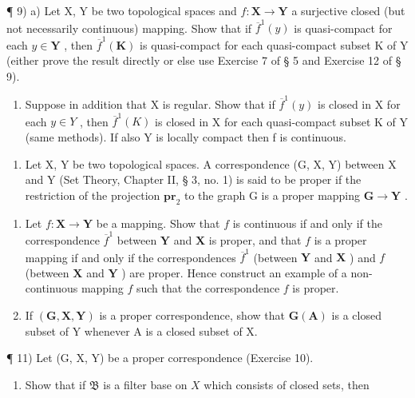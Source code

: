 ¶ 9) a) Let X, Y be two topological spaces and \(f: \mathbf{X} \to \mathbf{Y}\) a surjective closed (but not necessarily continuous) mapping. Show that if \(\overline{f}^{1}(y)\) is quasi-compact for each \(y \in \mathbf{Y}\) , then \(\overline{f}^{1}(\mathbf{K})\) is quasi-compact for each quasi-compact subset K of Y (either prove the result directly or else use Exercise 7 of § 5 and Exercise 12 of § 9).

\begin{enumerate}
\def\labelenumi{\alph{enumi})}
\setcounter{enumi}{1}
\tightlist
\item
  Suppose in addition that X is regular. Show that if \(\overline{f}^{1}(y)\) is closed in X for each \(y \in Y\) , then \(\overline{f}^{1}(K)\) is closed in X for each quasi-compact subset K of Y (same methods). If also Y is locally compact then f is continuous.
\end{enumerate}

\begin{enumerate}
\def\labelenumi{\arabic{enumi})}
\setcounter{enumi}{9}
\tightlist
\item
  Let X, Y be two topological spaces. A correspondence (G, X, Y) between X and Y (Set Theory, Chapter II, § 3, no. 1) is said to be proper if the restriction of the projection \(\mathbf{pr}_2\) to the graph G is a proper mapping \(\mathbf{G} \to \mathbf{Y}\) .
\end{enumerate}

\begin{enumerate}
\def\labelenumi{\alph{enumi})}
\item
  Let \(f: \mathbf{X} \to \mathbf{Y}\) be a mapping. Show that \(f\) is continuous if and only if the correspondence \(\overline{f}^1\) between \(\mathbf{Y}\) and \(\mathbf{X}\) is proper, and that \(f\) is a proper mapping if and only if the correspondences \(\overline{f}^1\) (between \(\mathbf{Y}\) and \(\mathbf{X}\) ) and \(f\) (between \(\mathbf{X}\) and \(\mathbf{Y}\) ) are proper. Hence construct an example of a non-continuous mapping \(f\) such that the correspondence \(f\) is proper.
\item
  If \((\mathbf{G}, \mathbf{X}, \mathbf{Y})\) is a proper correspondence, show that \(\mathbf{G}(\mathbf{A})\) is a closed subset of Y whenever A is a closed subset of X.
\end{enumerate}

¶ 11) Let (G, X, Y) be a proper correspondence (Exercise 10).

\begin{enumerate}
\def\labelenumi{\alph{enumi})}
\tightlist
\item
  Show that if \(\mathfrak{B}\) is a filter base on \(X\) which consists of closed sets, then
\end{enumerate}

